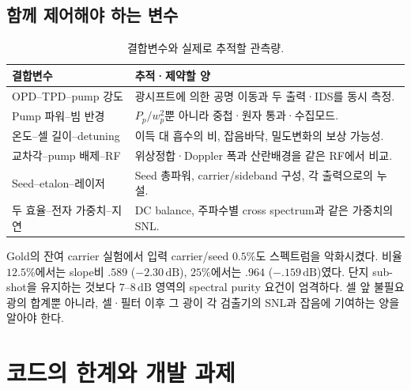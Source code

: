 \documentclass[11pt,a4paper]{article}
\newcommand{\dB}{\,\mathrm{dB}}
\begin{document}
\subsection{함께 제어해야 하는 변수}
\begin{table}[htbp]\centering
\caption{결합변수와 실제로 추적할 관측량.}
\begin{tabularx}{\linewidth}{P{4.2cm}Y}
\toprule 결합변수 & 추적·제약할 양\\\midrule
OPD--TPD--pump 강도 & 광시프트에 의한 공명 이동과 두 출력·IDS를 동시 측정.\\
Pump 파워--빔 반경 & $P_p/w_p^2$뿐 아니라 중첩·원자 통과·수집모드.\\
온도--셀 길이--detuning & 이득 대 흡수의 비, 잡음바닥, 밀도변화의 보상 가능성.\\
교차각--pump 배제--RF & 위상정합·Doppler 폭과 산란배경을 같은 RF에서 비교.\\
Seed--etalon--레이저 & Seed 총파워, carrier/sideband 구성, 각 출력으로의 누설.\\
두 효율--전자 가중치--지연 & DC balance, 주파수별 cross spectrum과 같은 가중치의 SNL.\\
\bottomrule
\end{tabularx}
\end{table}

Gold의 잔여 carrier 실험에서 입력 carrier/seed $0.5\%$도 스펙트럼을
악화시켰다. 비율 $12.5\%$에서는 slope비 $.589$ ($-2.30\dB$),
$25\%$에서는 $.964$ ($-.159\dB$)였다\cite{sim}.
단지 sub-shot을 유지하는 것보다 $7$--$8\dB$ 영역의 spectral purity
요건이 엄격하다. 셀 앞 불필요 광의 합계뿐 아니라, 셀·필터 이후 그 광이
각 검출기의 SNL과 잡음에 기여하는 양을 알아야 한다.

\section{코드의 한계와 개발 과제}
\end{document}
